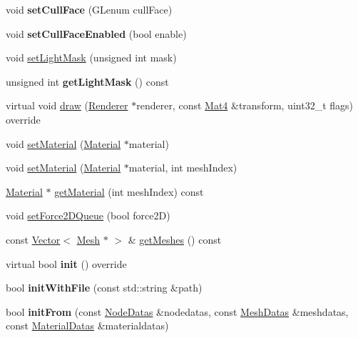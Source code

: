 \begin{DoxyCompactItemize}
\mbox{\label{classSprite3D_a7658e390030b102ad830b6dc0d9eda89}} 
void {\bfseries set\+Cull\+Face} (G\+Lenum cull\+Face)
\item 
\mbox{\label{classSprite3D_acaf719386b479287dc199d9e3eaca85c}} 
void {\bfseries set\+Cull\+Face\+Enabled} (bool enable)
\item 
void \hyperlink{classSprite3D_a0fa47c29a1b6e9cf7a0a2eaa45c1e43a}{set\+Light\+Mask} (unsigned int mask)
\item 
\mbox{\label{classSprite3D_a1fc8414da76ad447824a6053c8ae1a5d}} 
unsigned int {\bfseries get\+Light\+Mask} () const
\item 
virtual void \hyperlink{classSprite3D_ac0d723dba5fb1bf83816f74a6dbe4bf8}{draw} (\hyperlink{classRenderer}{Renderer} $\ast$renderer, const \hyperlink{classMat4}{Mat4} \&transform, uint32\+\_\+t flags) override
\item 
void \hyperlink{classSprite3D_ac984a24d1e5fc0e9071eef14e5041c42}{set\+Material} (\hyperlink{classMaterial}{Material} $\ast$material)
\item 
void \hyperlink{classSprite3D_a83fef9c35a0cb8866426b3e709ed5fab}{set\+Material} (\hyperlink{classMaterial}{Material} $\ast$material, int mesh\+Index)
\item 
\hyperlink{classMaterial}{Material} $\ast$ \hyperlink{classSprite3D_accf93d15ef4ee911082d41cea67964bc}{get\+Material} (int mesh\+Index) const
\item 
void \hyperlink{classSprite3D_af1ed52e0440a81ce14577834b5073e1d}{set\+Force2\+D\+Queue} (bool force2D)
\item 
const \hyperlink{classVector}{Vector}$<$ \hyperlink{classMesh}{Mesh} $\ast$ $>$ \& \hyperlink{classSprite3D_a024e3c351fa61b0a8c39dfcd2ee3dd0e}{get\+Meshes} () const
\item 
\mbox{\label{classSprite3D_ac205856736cc07b965e90f1336535ada}} 
virtual bool {\bfseries init} () override
\item 
\mbox{\label{classSprite3D_ac275f6c8628e0a40438b4c6f9033b0b7}} 
bool {\bfseries init\+With\+File} (const std\+::string \&path)
\item 
\mbox{\label{classSprite3D_a60e445c03edcf02cdfbc40391f4ccaba}} 
bool {\bfseries init\+From} (const \hyperlink{structNodeDatas}{Node\+Datas} \&nodedatas, const \hyperlink{structMeshDatas}{Mesh\+Datas} \&meshdatas, const \hyperlink{structMaterialDatas}{Material\+Datas} \&materialdatas)

\end{DoxyCompactItemize}
